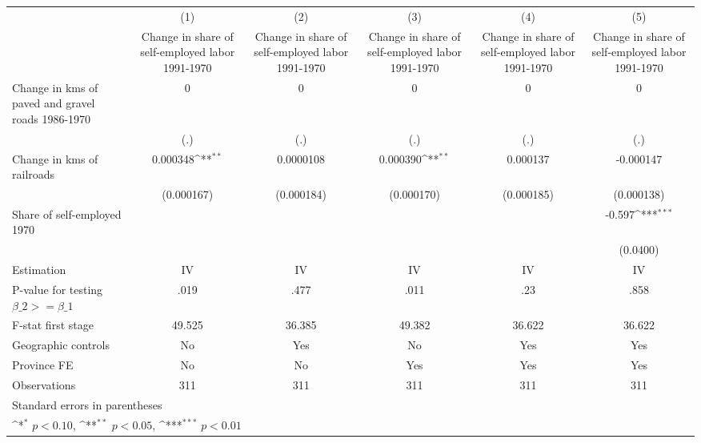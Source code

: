 {
\def\sym#1{\ifmmode^{#1}\else\(^{#1}\)\fi}
\begin{tabular}{l*{5}{c}}
\hline\hline
                    &\multicolumn{1}{c}{(1)}&\multicolumn{1}{c}{(2)}&\multicolumn{1}{c}{(3)}&\multicolumn{1}{c}{(4)}&\multicolumn{1}{c}{(5)}\\
                    &\multicolumn{1}{c}{Change in share of self-employed labor 1991-1970}&\multicolumn{1}{c}{Change in share of self-employed labor 1991-1970}&\multicolumn{1}{c}{Change in share of self-employed labor 1991-1970}&\multicolumn{1}{c}{Change in share of self-employed labor 1991-1970}&\multicolumn{1}{c}{Change in share of self-employed labor 1991-1970}\\
\hline
Change in kms of paved and gravel roads 1986-1970&           0         &           0         &           0         &           0         &           0         \\
                    &         (.)         &         (.)         &         (.)         &         (.)         &         (.)         \\
[1em]
Change in kms of railroads&    0.000348\sym{**} &   0.0000108         &    0.000390\sym{**} &    0.000137         &   -0.000147         \\
                    &  (0.000167)         &  (0.000184)         &  (0.000170)         &  (0.000185)         &  (0.000138)         \\
[1em]
Share of self-employed 1970&                     &                     &                     &                     &      -0.597\sym{***}\\
                    &                     &                     &                     &                     &    (0.0400)         \\
\hline
Estimation          &          IV         &          IV         &          IV         &          IV         &          IV         \\
P-value for testing $\beta\_2 >= \beta\_1$&        .019         &        .477         &        .011         &         .23         &        .858         \\
F-stat first stage  &      49.525         &      36.385         &      49.382         &      36.622         &      36.622         \\
Geographic controls &          No         &         Yes         &          No         &         Yes         &         Yes         \\
Province FE         &          No         &          No         &         Yes         &         Yes         &         Yes         \\
Observations        &         311         &         311         &         311         &         311         &         311         \\
\hline\hline
\multicolumn{6}{l}{\footnotesize Standard errors in parentheses}\\
\multicolumn{6}{l}{\footnotesize \sym{*} \(p<0.10\), \sym{**} \(p<0.05\), \sym{***} \(p<0.01\)}\\
\end{tabular}
}
